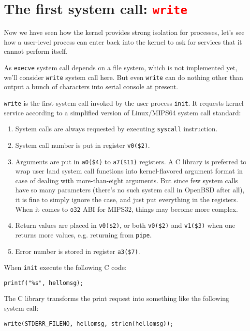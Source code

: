 \documentclass{report}
\def \hilite#1{\textcolor{red}{#1}}
\newenvironment{hilight}{\color{red}}{\color{black}}
\begin{document}
	\section{The first system call: \hilite{\texttt{write}}}
	Now we have seen how the kernel provides strong isolation for processes, let’s see
	how a user-level process can enter back into the kernel to ask for services that it
	cannot perform itself.
	
	\begin{hilight}
		As \texttt{execve} system call depends on a file system, which is not implemented
		yet, we'll consider \texttt{write} system call here.  But even \texttt{write} can
		do nothing other than output a bunch of characters into serial console at present.

		\texttt{write} is the first system call invoked by the user process \texttt{init}.
		It requests kernel service according to a simplified version of Linux/MIPS64 system
		call standard:
		\begin{enumerate}
			\item System calls are always requested by executing \texttt{syscall} instruction.
			\item System call number is put in register \texttt{v0(\$2)}.
			\item Arguments are put in \texttt{a0(\$4)} to \texttt{a7(\$11)} registers.
			A C library is preferred to wrap user land system call functions into kernel-flavored
			argument format in case of dealing with more-than-eight arguments.  But since few system
			calls have so many parameters (there's no such system call in OpenBSD after all),
			it is fine to simply ignore the case, and just put everything in the registers.
			When it comes to \texttt{o32} ABI for MIPS32, things may become more complex.
			\item Return values are placed in \texttt{v0(\$2)}, or both \texttt{v0(\$2)} and
			\texttt{v1(\$3)} when one returns more values, e.g. returning from \texttt{pipe}.
			\item Error number is stored in register \texttt{a3(\$7)}.
		\end{enumerate}
		
		When \texttt{init} execute the following C code:
		\begin{lstlisting}[style=c]
		printf("%s", hellomsg);
		\end{lstlisting}
		The C library transforms the print request into something like the following system call:
		\begin{lstlisting}[style=c]
		write(STDERR_FILENO, hellomsg, strlen(hellomsg));
		\end{lstlisting}
	\end{hilight}
	
\end{document}
